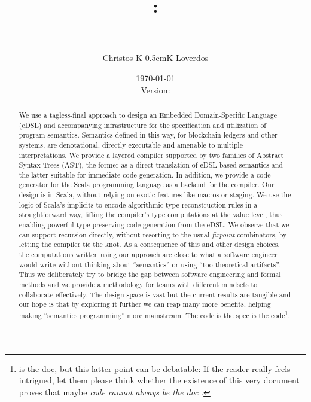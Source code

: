 \documentclass[11pt]{article}
\title{\TheTitleA:\\
{\smaller \TheTitleB}\\
\vspace{0.25\baselineskip}
\smaller[2] \textit{\TheOneSpec}}
\author{Christos {K{\kern-0.5em}K} Loverdos}
\date{\today\\
Version: \texttt{\smaller}
}
\begin{document}
\maketitle

\begin{tcolorbox}[beamer,enhanced,colback=white,boxrule=0.2pt]
\begin{abstract}
We use a tagless-final approach to design an Embedded Domain-Specific Language (eDSL) and accompanying infrastructure for the specification and utilization of program semantics. Semantics defined in this way, for blockchain ledgers and other systems, are denotational, directly executable and amenable to multiple interpretations. We provide a layered compiler supported by two families of Abstract Syntax Trees (AST), the former as a direct translation of eDSL-based semantics and the latter suitable for immediate code generation. In addition, we provide a code generator for the Scala programming language as a backend for the compiler. Our design is in Scala, without relying on exotic features like macros or staging. We use the logic of Scala's implicits to encode algorithmic type reconstruction rules in a straightforward way, lifting the compiler's type computations at the value level, thus enabling powerful type-preserving code generation from the eDSL. We observe that we can support recursion directly, without resorting to the usual \textit{fixpoint} combinators, by letting the compiler tie the knot. As a consequence of this and other design choices, the computations written using our approach are close to what a software engineer would write without thinking about ``semantics'' or using ``too theoretical artifacts''. Thus we deliberately try to bridge the gap between software engineering and formal methods and we provide a methodology for teams with different mindsets to collaborate effectively. The design space is vast but the current results are tangible and our hope is that by exploring it further we can reap many more benefits, helping making ``semantics programming'' more mainstream. The code is the spec is the code\footnote{is the doc, but this latter point can be debatable: If the reader really feels intrigued, let them please think whether the existence of this very document proves that maybe \textit{code cannot always be the doc \faLightbulbO}.}.


\end{abstract}
\end{tcolorbox}
\end{document}
